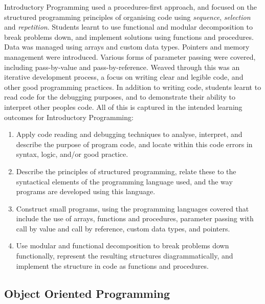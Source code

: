 Introductory Programming used a procedures-first approach, and focused on the structured programming principles of organising code using \emph{sequence}, \emph{selection} and \emph{repetition}. Students learnt to use functional and modular decomposition to break problems down, and implement solutions using functions and procedures. Data was managed using arrays and custom data types. Pointers and memory management were introduced. Various forms of parameter passing were covered, including pass-by-value and pass-by-reference. Weaved through this was an iterative development process, a focus on writing clear and legible code, and other good programming practices. In addition to writing code, students learnt to read code for the debugging purposes, and to demonstrate their ability to interpret other peoples code. All of this is captured in the intended learning outcomes for Introductory Programming:
\begin{enumerate}
	\item Apply code reading and debugging techniques to analyse, interpret, and describe the purpose of program code, and locate within this code errors in syntax, logic, and/or good practice.
	\item Describe the principles of structured programming, relate these to the syntactical elements of the programming language used, and the way programs are developed using this language.
	\item Construct small programs, using the programming languages covered that include the use of arrays, functions and procedures, parameter passing with call by value and call by reference, custom data types, and pointers.
	\item Use modular and functional decomposition to break problems down functionally, represent the resulting structures diagrammatically, and implement the structure in code as functions and procedures.
\end{enumerate}







\subsection{Object Oriented Programming} %
\label{sub:object_oriented_programming}


